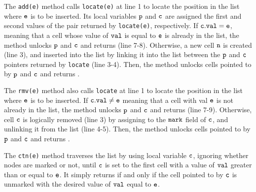  


The {\tt add(e)} method calls {\tt locate(e)} at line 1 to locate the position in the list where $\tt e$ is to be inserted. Its local variables $\tt p$ and $\tt c$ are assigned the first and second values of the pair returned by {\tt locate(e)}, respectively. If $\tt c.val = e$, meaning that a cell whose value of $\tt val$ is equal to $\tt e$ is already in the list, the method unlocks $\tt p$ and $\tt c$ and returns \false \; (line 7-8). Otherwise, a new cell $\tt n$ is created (line 3), and inserted into the list by linking it into the list between the $\tt p$ and $\tt c$ pointers returned by
{\tt locate} (line 3-4). Then, the method unlocks cells pointed to by $\tt p$ and $\tt c$ and returns \true.  

The {\tt rmv(e)} method also calls {\tt locate} at line 1 to locate the position in the list where $\tt e$ is to be inserted. If $\tt c.val \neq e$ meaning that a cell with val $\tt e$ is not already in the list, the method unlocks $\tt p$ and $\tt c$ and returns \false \;(line 7-9). Otherwise, cell $\tt c$ is logically removed (line 3) by assigning \true\; to the $\tt mark$ field of $\tt c$, and unlinking it from the list (line 4-5). Then, the method unlocks cells pointed to by $\tt p$ and $\tt c$ and returns \true.  

The {\tt ctn(e)} method traverses the list by using local variable $\tt c$, ignoring whether nodes are marked or not, until $\tt c$ is set to the
first cell with a value of $\tt val$ greater than or equal to $\tt e$. It simply returns \true \; if and only if the cell pointed to by $\tt c$  is unmarked with the desired value of $\tt val$ equal to $\tt e$. 
